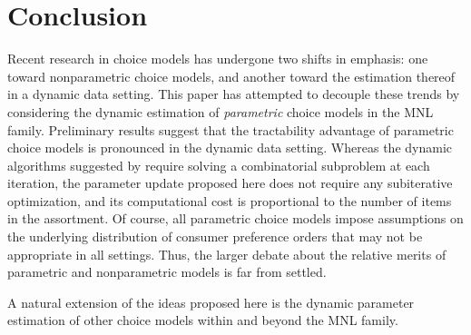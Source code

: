 \documentclass[preprint,12pt,authoryear]{elsarticle}
\begin{document}
\section{Conclusion}
Recent research in choice models has undergone two shifts in emphasis: one toward nonparametric choice models, and another toward the estimation thereof in a dynamic data setting. This paper has attempted to decouple these trends by considering the dynamic estimation of \emph{parametric} choice models in the MNL family. Preliminary results suggest that the tractability advantage of parametric choice models is pronounced in the dynamic data setting. Whereas the dynamic algorithms suggested by \cite{honguyen2021} require solving a combinatorial subproblem at each iteration, the parameter update proposed here does not require any subiterative optimization, and its computational cost is proportional to the number of items in the assortment. Of course, all parametric choice models impose assumptions on the underlying distribution of consumer preference orders that may not be appropriate in all settings. Thus, the larger debate about the relative merits of parametric and nonparametric models is far from settled.

A natural extension of the ideas proposed here is the dynamic parameter estimation of other choice models within and beyond the MNL family. 




\end{document}
